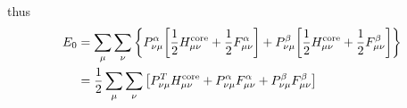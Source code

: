 \documentclass[a4paper]{article}
\DeclareMathOperator{\core}{\mathrm{core}}
\numberwithin{equation}{subsection}
\begin{document}
thus
\begin{align}
E_0 &= \sum_\mu\sum_\nu \qty{P^\alpha_{\nu\mu} \qty[\dfrac{1}{2} H^{\core}_{\mu\nu} + \dfrac{1}{2} F^\alpha_{\mu\nu} ]  
+ P^\beta_{\nu\mu} \qty[\dfrac{1}{2} H^{\core}_{\mu\nu} + \dfrac{1}{2} F^\beta_{\mu\nu} ]} \notag\\
&= \dfrac{1}{2} \sum_\mu\sum_\nu \qty[P^T_{\nu\mu} H^{\core}_{\mu\nu} + P^\alpha_{\nu\mu}F^\alpha_{\mu\nu}  + P^\beta_{\nu\mu}F^\beta_{\mu\nu} ]
\end{align}
\end{document}
